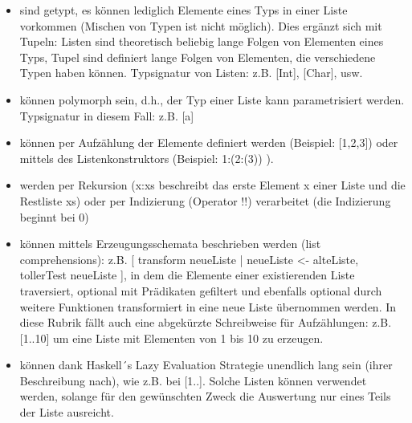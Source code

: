 \begin{itemize}
	\item sind getypt, es können lediglich Elemente eines Typs in einer Liste vorkommen (Mischen von Typen ist nicht möglich). Dies ergänzt sich mit Tupeln: Listen sind theoretisch beliebig lange Folgen von Elementen eines Typs, Tupel sind definiert lange Folgen von Elementen, die verschiedene Typen haben können. Typsignatur von Listen: z.B. [Int], [Char], usw.
	\item können polymorph sein, d.h., der Typ einer Liste kann parametrisiert werden. Typsignatur in diesem Fall: z.B. [a]
	\item können per Aufzählung der Elemente definiert werden (Beispiel: [1,2,3]) oder mittels des Listenkonstruktors (Beispiel: 1:(2:(3)) ).
	\item werden per Rekursion (x:xs beschreibt das erste Element x einer Liste und die Restliste xs) oder per Indizierung (Operator !!) verarbeitet (die Indizierung beginnt bei 0)
	\item können mittels Erzeugungsschemata beschrieben werden (list comprehensions): z.B. [ transform neueListe | neueListe <- alteListe, tollerTest neueListe ], in dem die Elemente einer existierenden Liste traversiert, optional mit Prädikaten gefiltert und ebenfalls optional durch weitere Funktionen transformiert in eine neue Liste übernommen werden. In diese Rubrik fällt auch eine abgekürzte Schreibweise für Aufzählungen: z.B. [1..10] um eine Liste mit Elementen von 1 bis 10 zu erzeugen.
	\item können dank Haskell´s Lazy Evaluation Strategie unendlich lang sein (ihrer Beschreibung nach), wie z.B. bei [1..]. Solche Listen können verwendet werden, solange für den gewünschten Zweck die Auswertung nur eines Teils der Liste ausreicht.
\end{itemize}


